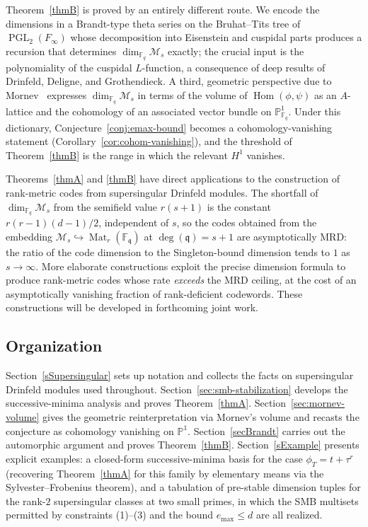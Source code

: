 \documentclass[12pt]{amsart}
\theoremstyle{definition}
\theoremstyle{remark}
\numberwithin{equation}{section}
\numberwithin{thm}{section}
\DeclareMathOperator{\Hom}{Hom}
\DeclareMathOperator{\Mat}{Mat}
\DeclareMathOperator{\PGL}{PGL}
\newcommand{\fq}{\mathfrak{q}}
\newcommand{\cM}{\mathcal{M}}
\newcommand{\F}{\mathbb{F}}
\newcommand{\PP}{\mathbb{P}}
\newcommand{\Fi}{F_\infty}
\begin{document}
	\medskip
	
	Theorem~\ref{thmB} is proved by an entirely different route. We encode the dimensions in a Brandt-type theta series on the Bruhat--Tits tree of $\PGL_2(\Fi)$ whose decomposition into Eisenstein and cuspidal parts produces a recursion that determines $\dim_{\F_q}\cM_s$ exactly; the crucial input is the polynomiality of the cuspidal $L$-function, a consequence of deep results of Drinfeld, Deligne, and Grothendieck. A third, geometric perspective due to Mornev~\cite{Mornev} expresses $\dim_{\F_q}\cM_s$ in terms of the volume of $\Hom(\phi, \psi)$ as an $A$-lattice and the cohomology of an associated vector bundle on $\PP^1_{\F_q}$. Under this dictionary, Conjecture~\ref{conj:emax-bound} becomes a cohomology-vanishing statement (Corollary~\ref{cor:cohom-vanishing}), and the threshold of Theorem~\ref{thmB} is the range in which the relevant $H^1$ vanishes.
	
	Theorems~\ref{thmA} and \ref{thmB} have direct applications to the construction of rank-metric codes from supersingular Drinfeld modules. The shortfall of $\dim_{\F_q}\cM_s$ from the semifield value $r(s+1)$ is the constant $r(r-1)(d-1)/2$, independent of $s$, so the codes obtained from the embedding $\cM_s\hookrightarrow \Mat_r(\F_\fq)$ at $\deg(\fq) = s+1$ are asymptotically MRD: the ratio of the code dimension to the Singleton-bound dimension tends to $1$ as $s\to\infty$. More elaborate constructions exploit the precise dimension formula to produce rank-metric codes whose rate \emph{exceeds} the MRD ceiling, at the cost of an asymptotically vanishing fraction of rank-deficient codewords. These constructions will be developed in forthcoming joint work.
	
	\subsection*{Organization}
	
	Section~\ref{sSupersingular} sets up notation and collects the facts on supersingular Drinfeld modules used throughout. Section~\ref{sec:smb-stabilization} develops the successive-minima analysis and proves Theorem~\ref{thmA}. Section~\ref{sec:mornev-volume} gives the geometric reinterpretation via Mornev's volume and recasts the conjecture as cohomology vanishing on $\PP^1$. Section~\ref{secBrandt} carries out the automorphic argument and proves Theorem~\ref{thmB}. Section~\ref{sExample} presents explicit examples: a closed-form successive-minima basis for the case $\phi_T = t + \tau^r$ (recovering Theorem~\ref{thmA} for this family by elementary means via the Sylvester--Frobenius theorem), and a tabulation of pre-stable dimension tuples for the rank-$2$ supersingular classes at two small primes, in which the SMB multisets permitted by constraints (1)--(3) and the bound $e_{\max}\leq d$ are all realized.
	
\end{document}
